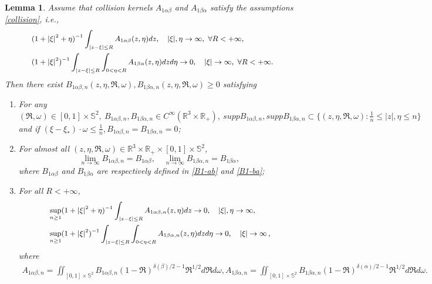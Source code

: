 \documentclass[reqno,11pt]{amsart}
\newtheorem{lemma}{Lemma}[section]
\numberwithin{equation}{section}
\def\R{\mathbb{R}}
\begin{document}
\begin{lemma}\label{Lemma 4.11}
	Assume that collision kernels $A_{1\alpha \beta }$ and $A_{1\beta \alpha }$ satisfy the assumptions \eqref{collision}, i.e.,
	\begin{equation*}{\small
		\begin{aligned}
			&(1+|\xi|^2 + \eta )^{-1} \int_{|z-\xi |\leq R } A_{1\alpha \beta } (z,\eta ) dz,  \quad |\xi|,\eta  \rightarrow \infty, \ \forall R <+\infty, \\
			&(1+|\xi|^2 )^{-1}\int_{|z-\xi |\leq R }  \int_{0<\eta < R } A_{1\beta \alpha } (z,\eta ) dzd\eta \rightarrow 0, \quad |\xi| \rightarrow \infty , \ \forall R <+\infty.
		\end{aligned}}
	\end{equation*}	
	Then there exist $B_{1\alpha \beta ,n }(z,\eta , \mathfrak{R},\omega ) ,B_{1 \beta \alpha ,n } (z,\eta , \mathfrak{R},\omega ) \geq 0 $ satisfying 
	\begin{enumerate}
		\item {For any $(\mathfrak{R},\omega)\in [0,1] \times \mathbb{S}^2,\ B_{1\alpha \beta , n } , B_{1 \beta \alpha ,n }  \in C^\infty (\R^3 \times \R_+),\ supp B_{1\alpha \beta , n },supp B_{1 \beta \alpha ,n } \subset \{(z,\eta , \mathfrak{R},\omega ): \frac{1}{n} \leq |z|,\eta \leq n \}$ and if $ (\xi -\xi_* ) \cdot \omega \leq \frac{1}{n} , B_{1\alpha \beta , n } =B_{1 \beta \alpha ,n }=0$;}\label{1 of Lemma 4.11}
		\item  {For almost all $(z,\eta , \mathfrak{R},\omega )\in \R^3 \times \R_+ \times [0,1] \times \mathbb{S}^2$,
		\begin{equation*}
  \lim \limits_{n\rightarrow \infty } B_{1\alpha \beta ,n } =B_{1\alpha \beta },\quad
 \lim \limits_{n\rightarrow \infty } B_{1\beta \alpha ,n } =B_{1\beta \alpha },
\end{equation*} 
where $B_{1 \alpha \beta}$ and $B_{1 \beta \alpha}$ are respectively defined in \eqref{B1-ab} and \eqref{B1-ba};} \label{2 of Lemma 4.11}
		\item {For all $R < + \infty$,
			\begin{equation*}{\small
				\begin{aligned}
					&\sup \limits_{n \geq 1} (1+|\xi|^2 + \eta )^{-1} \int_{|z-\xi |\leq R } A_{1\alpha \beta ,n } (z,\eta ) dz \rightarrow 0, \quad |\xi|, \eta \rightarrow \infty , \\
					&\sup \limits_{n \geq 1} (1+|\xi|^2 )^{-1}\int_{|z-\xi |\leq R }  \int_{0<\eta < R } A_{1\beta \alpha ,n} (z,\eta ) dzd\eta \rightarrow 0, \quad |\xi| \rightarrow \infty \,,
				\end{aligned}}
		\end{equation*}
   where 
{\small
    \begin{align*}
   A_{1\alpha \beta ,n } =\iint_{[0,1]\times \mathbb{S}^2} B_{1\alpha \beta ,n } (1-\mathfrak{R})^{\delta(\beta )/2-1}\mathfrak{R}^{1/2}  d\mathfrak{R}d\omega, A_{1\beta \alpha ,n } =\iint_{[0,1]\times \mathbb{S}^2} B_{1\beta \alpha ,n }   (1-\mathfrak{R})^{\delta(\alpha )/2-1}\mathfrak{R}^{1/2}d\mathfrak{R}d\omega.
   \end{align*}}
  }\label{3 of Lemma 4.11}
	\end{enumerate}
\end{lemma}
\end{document}
